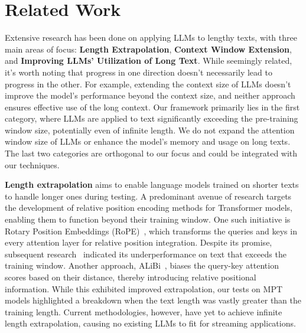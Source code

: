 \vspace{-0.5em}
\section{Related Work}
\vspace{-0.5em}
Extensive research has been done on applying LLMs to lengthy texts, with three main areas of focus: \textbf{Length Extrapolation}, \textbf{Context Window Extension}, and \textbf{Improving LLMs' Utilization of Long Text}. While seemingly related, it's worth noting that progress in one direction doesn't necessarily lead to progress in the other. For example, extending the context size of LLMs doesn't improve the model's performance beyond the context size, and neither approach ensures effective use of the long context. Our \method framework primarily lies in the first category, where LLMs are applied to text significantly exceeding the pre-training window size, potentially even of infinite length. We do not expand the attention window size of LLMs or enhance the model's memory and usage on long texts. The last two categories are orthogonal to our focus and could be integrated with our techniques.

\textbf{Length extrapolation} aims to enable language models trained on shorter texts to handle longer ones during testing. A predominant avenue of research targets the development of relative position encoding methods for Transformer models, enabling them to function beyond their training window. One such initiative is Rotary Position Embeddings (RoPE)~\citep{su2021roformer}, which transforms the queries and keys in every attention layer for relative position integration. Despite its promise, subsequent research~\citep{alibi, chen2023extending} indicated its underperformance on text that exceeds the training window. Another approach, ALiBi~\citep{alibi}, biases the query-key attention scores based on their distance, thereby introducing relative positional information. While this exhibited improved extrapolation, our tests on MPT models highlighted a breakdown when the text length was vastly greater than the training length. Current methodologies, however, have yet to achieve infinite length extrapolation, causing no existing LLMs to fit for streaming applications.

